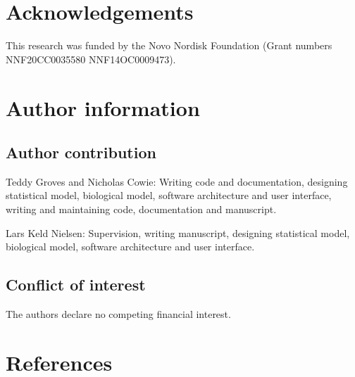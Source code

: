 \documentclass[journal=asbcd6,manuscript=article,layout=traditional]{achemso}
\begin{document}
\section{Acknowledgements}\label{acknowledgements}

This research was funded by the Novo Nordisk Foundation (Grant numbers
NNF20CC0035580 NNF14OC0009473).

\section{Author information}\label{author-information}

\subsection{Author contribution}\label{author-contribution}

Teddy Groves and Nicholas Cowie: Writing code and documentation,
designing statistical model, biological model, software architecture and
user interface, writing and maintaining code, documentation and
manuscript.

Lars Keld Nielsen: Supervision, writing manuscript, designing
statistical model, biological model, software architecture and user
interface.

\subsection{Conflict of interest}\label{conflict-of-interest}

The authors declare no competing financial interest.

\section{References}\label{references}

\renewcommand{\bibsection}{}

\end{document}

